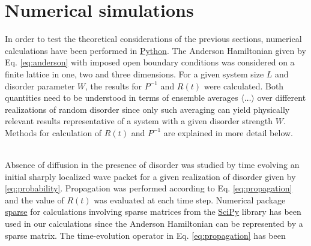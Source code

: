 \documentclass[10pt,a4paper]{article}
\begin{document}
\section{Numerical simulations}
In order to test the theoretical considerations of the previous sections, numerical calculations have been performed in \url{Python}. The Anderson Hamiltonian given by Eq. \eqref{eq:anderson} with imposed open boundary conditions was considered on a finite lattice in one, two and three dimensions. For a given system size $L$ and disorder parameter $W$, the results for $P^{-1}$ and $R(t)$ were calculated. Both quantities need to be understood in terms of ensemble averages $\langle \dots \rangle$ over different realizations of random disorder since only such averaging can yield physically relevant results representative of a system with a given disorder strength $W$. Methods for calculation of $R(t)$ and $P^{-1}$ are explained in more detail below. \\\\
\begin{minipage}[t]{0.27\textwidth}
Absence of diffusion in the presence of disorder was studied by time evolving an initial sharply localized wave packet for a given realization of disorder given by \eqref{eq:probability}. Propagation was performed according to Eq. \eqref{eq:propagation} and the value of $R(t)$ was evaluated at each time step. Numerical package \url{sparse} for calculations involving sparse matrices from the \url{SciPy} library has been used in our calculations since the Anderson Hamiltonian can be represented by a sparse matrix. The time-evolution operator in Eq. \eqref{eq:propagation} has been 
\end{minipage}\hfill
\end{document}

